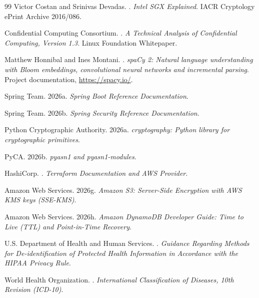 \documentclass[11pt]{article}
\begin{document}
\begin{thebibliography}{99}
Victor Costan and Srinivas Devadas.
.
\newblock \emph{Intel SGX Explained}.
\newblock IACR Cryptology ePrint Archive 2016/086.

Confidential Computing Consortium.
.
\newblock \emph{A Technical Analysis of Confidential Computing,
Version 1.3}.
\newblock Linux Foundation Whitepaper.

Matthew Honnibal and Ines Montani.
.
\newblock \emph{spaCy 2: Natural language understanding with Bloom
embeddings, convolutional neural networks and incremental parsing}.
\newblock Project documentation, \url{https://spacy.io/}.

Spring Team.
\newblock 2026a.
\newblock \emph{Spring Boot Reference Documentation}.

Spring Team.
\newblock 2026b.
\newblock \emph{Spring Security Reference Documentation}.

Python Cryptographic Authority.
\newblock 2026a.
\newblock \emph{cryptography: Python library for cryptographic
primitives}.

PyCA.
\newblock 2026b.
\newblock \emph{pyasn1 and pyasn1-modules}.

HashiCorp.
.
\newblock \emph{Terraform Documentation and AWS Provider}.

Amazon Web Services.
\newblock 2026g.
\newblock \emph{Amazon S3: Server-Side Encryption with AWS KMS
keys (SSE-KMS)}.

Amazon Web Services.
\newblock 2026h.
\newblock \emph{Amazon DynamoDB Developer Guide: Time to Live
(TTL) and Point-in-Time Recovery}.

U.S. Department of Health and Human Services.
.
\newblock \emph{Guidance Regarding Methods for De-identification of
Protected Health Information in Accordance with the HIPAA Privacy
Rule}.

World Health Organization.
.
\newblock \emph{International Classification of Diseases, 10th
Revision (ICD-10)}.

\end{thebibliography}
\end{document}
